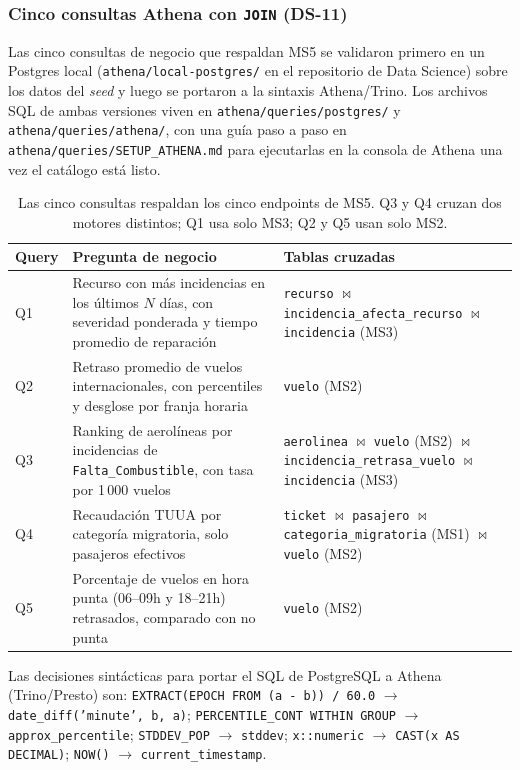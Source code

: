 \subsubsection{Cinco consultas Athena con \texttt{JOIN} (DS-11)}
Las cinco consultas de negocio que respaldan MS5 se validaron primero
en un Postgres local (\texttt{athena/local-postgres/} en el repositorio
de Data Science) sobre los datos del \emph{seed} y luego se portaron a
la sintaxis Athena/Trino. Los archivos SQL de ambas versiones viven en
\texttt{athena/queries/postgres/} y \texttt{athena/queries/athena/}, con
una guía paso a paso en \texttt{athena/queries/SETUP\_ATHENA.md} para
ejecutarlas en la consola de Athena una vez el catálogo está listo.

\begin{table}[htbp]
\centering\small
\begin{tabularx}{\textwidth}{p{}p{}X}
\toprule
Query & Pregunta de negocio & Tablas cruzadas \\
\midrule
Q1 & Recurso con más incidencias en los últimos $N$ días,
     con severidad ponderada y tiempo promedio de reparación &
     \texttt{recurso} $\bowtie$
     \texttt{incidencia\_afecta\_recurso} $\bowtie$
     \texttt{incidencia} (MS3) \\
Q2 & Retraso promedio de vuelos internacionales, con
     percentiles y desglose por franja horaria &
     \texttt{vuelo} (MS2) \\
Q3 & Ranking de aerolíneas por incidencias de
     \texttt{Falta\_Combustible}, con tasa por 1\,000 vuelos &
     \texttt{aerolinea} $\bowtie$ \texttt{vuelo} (MS2) $\bowtie$
     \texttt{incidencia\_retrasa\_vuelo} $\bowtie$ \texttt{incidencia}
     (MS3) \\
Q4 & Recaudación TUUA por categoría migratoria, solo pasajeros
     efectivos &
     \texttt{ticket} $\bowtie$ \texttt{pasajero} $\bowtie$
     \texttt{categoria\_migratoria} (MS1) $\bowtie$ \texttt{vuelo}
     (MS2) \\
Q5 & Porcentaje de vuelos en hora punta (06--09h y 18--21h)
     retrasados, comparado con no punta &
     \texttt{vuelo} (MS2) \\
\bottomrule
\end{tabularx}
\caption{Las cinco consultas respaldan los cinco endpoints de MS5. Q3 y
Q4 cruzan dos motores distintos; Q1 usa solo MS3; Q2 y Q5 usan solo
MS2.}
\label{tab:athena-queries}
\end{table}

Las decisiones sintácticas para portar el SQL de PostgreSQL a Athena
(Trino/Presto) son:
\texttt{EXTRACT(EPOCH FROM (a - b)) / 60.0} $\to$
\texttt{date\_diff('minute', b, a)};
\texttt{PERCENTILE\_CONT WITHIN GROUP} $\to$
\texttt{approx\_percentile};
\texttt{STDDEV\_POP} $\to$ \texttt{stddev};
\texttt{x::numeric} $\to$ \texttt{CAST(x AS DECIMAL)};
\texttt{NOW()} $\to$ \texttt{current\_timestamp}.

